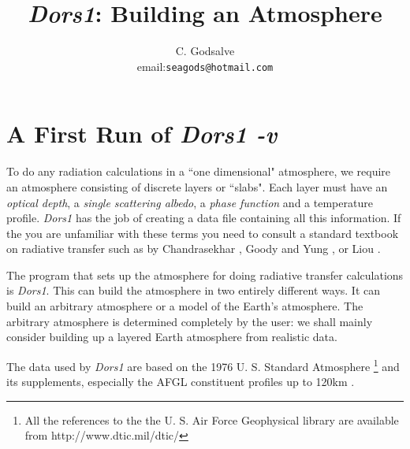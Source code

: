 \documentclass[12pt]{article}
\begin{document}


\thispagestyle{empty}

\title{{\it Dors1}: Building an Atmosphere}

\author{C. Godsalve \\
email:{\tt seagods@hotmail.com} }

\maketitle

\tableofcontents

\section{A First Run of {\it Dors1 -v}}

To do any radiation calculations in a ``one dimensional" atmosphere, we 
require an atmosphere consisting of discrete
layers or ``slabs". 
Each layer must have an {\it optical depth}, a {\it single scattering albedo}, 
 a {\it phase function} and a temperature profile. {\it Dors1} has the job of creating a
data file containing all this information. If the you are unfamiliar with these terms you need
to consult a standard textbook on radiative transfer such as by Chandrasekhar \cite{Chandrasekhar:Mybib},
 Goody and Yung \cite{GoodyYung:Mybib}, or Liou \cite{Liou:Mybib}.

The program that sets up
the atmosphere for doing radiative transfer calculations is {\it Dors1}. This can build
the atmosphere in two entirely different ways. It can build an arbitrary atmosphere
or a model of the Earth's atmosphere. The arbitrary atmosphere is determined
completely by the user: we shall mainly consider
building up a layered Earth atmosphere from realistic data. 

The data used by {\it Dors1} are based on
the 1976 U. S. Standard Atmosphere \footnote[1]{All the references to the the U. S. Air Force
Geophysical library are available from http://www.dtic.mil/dtic/}  \cite{USStandard:Mybib} and its supplements, especially 
the AFGL constituent
profiles up to 120km \cite{ConstProfs:Mybib}.
\end{document}
